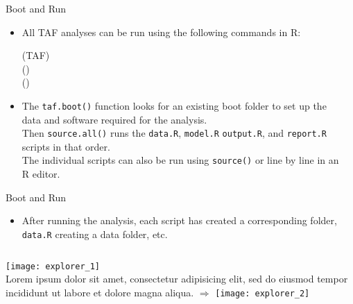 \documentclass[aspectratio=169]{beamer}
\begin{document}
\begin{frame}{Boot and Run}\small
  \begin{itemize}
    \item[] All TAF analyses can be run using the following commands in
    R:\\[2ex]
    \begin{tt}
      (TAF)\\
      ()\\
      ()\\[3ex]
    \end{tt}
    \item[] The {\tt\blue taf.boot()} function looks for an existing boot folder
    to set up the\\ data and software required for the analysis.\\[3ex]
    Then {\tt\blue source.all()} runs the {\tt data.R}, {\tt model.R}
    {\tt output.R}, and {\tt report.R}\\ scripts in that order.\\[3ex]
    The individual scripts can also be run using {\tt\blue source()} or line by
    line in an\\
    R editor.\\[4ex]
  \end{itemize}
\end{frame}


\begin{frame}{Boot and Run}\small
  \begin{itemize}
    \item[] After running the analysis, each script has created a corresponding
    folder,\\[0.2ex]
    {\tt data.R} creating a data folder, etc.\\
  \end{itemize}
  \begin{columns}[T]
    \texttt{[image: explorer\_1]}\\
    Lorem ipsum dolor sit amet, consectetur adipisicing elit, sed do eiusmod
    tempor incididunt ut labore et dolore magna aliqua.
    \vspace{4ex}
    \green\large$\Rightarrow$
    \texttt{[image: explorer\_2]}
  \end{columns}
\end{frame}
\end{document}
